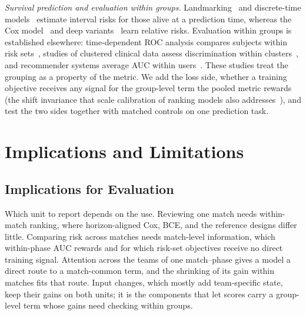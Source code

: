 \documentclass[sigconf,anonymous]{acmart}
\begin{document}
\emph{Survival prediction and evaluation within groups.} Landmarking~\cite{vanHouwelingen07} and discrete-time models~\cite{SingerWillett93,Gensheimer19} estimate interval risks for those alive at a prediction time, whereas the Cox model~\cite{Cox72} and deep variants~\cite{DeepHit18,DynamicDeepHit20} learn relative risks. Evaluation within groups is established elsewhere: time-dependent ROC analysis compares subjects within risk sets~\cite{HeagertyZheng05}, studies of clustered clinical data assess discrimination within clusters~\cite{vanKlaveren14}, and recommender systems average AUC within users~\cite{Zhou18}. These studies treat the grouping as a property of the metric. We add the loss side, whether a training objective receives any signal for the group-level term the pooled metric rewards (the shift invariance that scale calibration of ranking models also addresses~\cite{Yan22}), and test the two sides together with matched controls on one prediction task.

\section{Implications and Limitations}
\label{sec:discussion}
\subsection{Implications for Evaluation}
\label{sec:discussion:implications}
Which unit to report depends on the use. Reviewing one match needs within-match ranking, where horizon-aligned Cox, BCE, and the reference designs differ little. Comparing risk across matches needs match-level information, which within-phase AUC rewards and for which risk-set objectives receive no direct training signal. Attention across the teams of one match--phase gives a model a direct route to a match-common term, and the shrinking of its gain within matches fits that route. Input changes, which mostly add team-specific state, keep their gains on both units; it is the components that let scores carry a group-level term whose gains need checking within groups.
\end{document}
